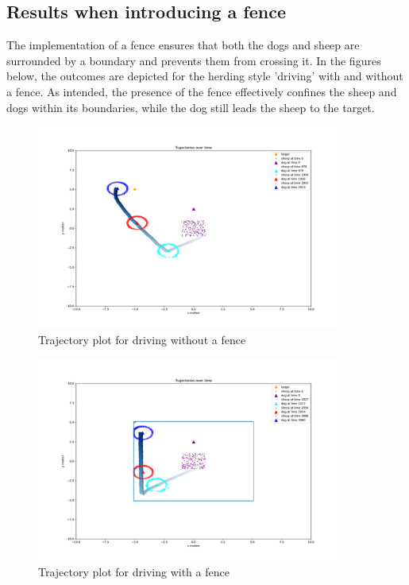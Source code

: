 \newpage


\subsection{Results when introducing a fence}
The implementation of a fence ensures that both the dogs and sheep are surrounded by a boundary and prevents them from crossing it. In the figures below, the outcomes are depicted for the herding style 'driving' with and without a fence. As intended, the presence of the fence effectively confines the sheep and dogs within its boundaries, while the dog still leads the sheep to the target.

\begin{figure}[!h]
    \includegraphics[width=0.9\textwidth]{figures/driving.pdf}
    \caption{Trajectory plot for driving without a fence}
\end{figure}

\begin{figure}[!h]
    \includegraphics[width=0.9\textwidth]{figures/driving-fence.pdf}
    \caption{Trajectory plot for driving with a fence}
\end{figure}

